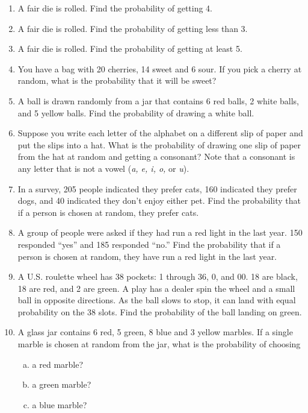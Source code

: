 \begin{enumerate}
\item A fair die is rolled. Find the probability of getting 4. 

\item A fair die is rolled. Find the probability of getting less than 3. 

\item A fair die is rolled. Find the probability of getting at least 5. 

\item You have a bag with 20 cherries, 14 sweet and 6 sour. If you pick a cherry at random, what is the probability that it will be sweet? 

\item A ball is drawn randomly from a jar that contains 6 red balls, 2 white balls, and 5 yellow balls. Find the probability of drawing a white ball. 

\item Suppose you write each letter of the alphabet on a different slip of paper and put the slips into a hat. What is the probability of drawing one slip of paper from the hat at random and getting a consonant?  Note that a consonant is any letter that is not a vowel (\emph{a, e, i, o,} or \emph{u}). 

\item In a survey, 205 people indicated they prefer cats, 160 indicated they prefer dogs, and 40 indicated they don't enjoy either pet. Find the probability that if a person is chosen at random, they prefer cats. 

\item A group of people were asked if they had run a red light in the last year. 150 responded ``yes'' and 185 responded ``no.'' Find the probability that if a person is chosen at random, they have run a red light in the last year. 

\item A U.S. roulette wheel has 38 pockets: 1 through 36, 0, and 00. 18 are black, 18 are red, and 2 are green. A play has a dealer spin the wheel and a small ball in opposite directions. As the ball slows to stop, it can land with equal probability on the 38 slots. Find the probability of the ball landing on green. 

\item A glass jar contains 6 red, 5 green, 8 blue and 3 yellow marbles. If a single marble is
chosen at random from the jar, what is the probability of choosing
\begin{enumerate}[(a)]
\item a red marble? 
\item a green marble? 
\item a blue marble? 
\end{enumerate}


\end{enumerate}

